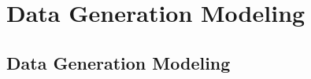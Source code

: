 \documentclass{ltjsbook}
\begin{document}
\chapter{Data Generation Modeling}
\label{x17_Bayesian}

\section{Data Generation Modeling}
\end{document}
